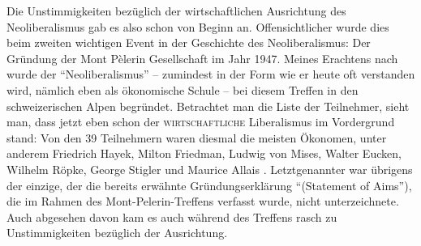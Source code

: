 Die Unstimmigkeiten bezüglich der wirtschaftlichen Ausrichtung des Neoliberalismus gab es also schon von Beginn an. Offensichtlicher wurde dies beim zweiten wichtigen Event in der Geschichte des Neoliberalismus: Der Gründung der Mont Pèlerin Gesellschaft im Jahr 1947. Meines Erachtens nach wurde der "`Neoliberalismus"' -- zumindest in der Form wie er heute oft verstanden wird, nämlich eben als ökonomische Schule -- bei diesem Treffen in den schweizerischen Alpen begründet. Betrachtet man die Liste der Teilnehmer, sieht man, dass jetzt eben schon der \textsc{wirtschaftliche} Liberalismus im Vordergrund stand: Von den 39 Teilnehmern waren diesmal die meisten Ökonomen, unter anderem Friedrich Hayek, Milton Friedman, Ludwig von Mises, Walter Eucken, Wilhelm Röpke, George Stigler und Maurice Allais \parencite[S. 12--19]{Mirowski2009}. Letztgenannter war übrigens der einzige, der die bereits erwähnte Gründungserklärung "`(Statement of Aims"'), die im Rahmen des Mont-Pelerin-Treffens verfasst wurde, nicht unterzeichnete\parencite[S. 57]{Mirowski2009}. Auch abgesehen davon kam es auch während des Treffens rasch zu Unstimmigkeiten bezüglich der Ausrichtung. 

